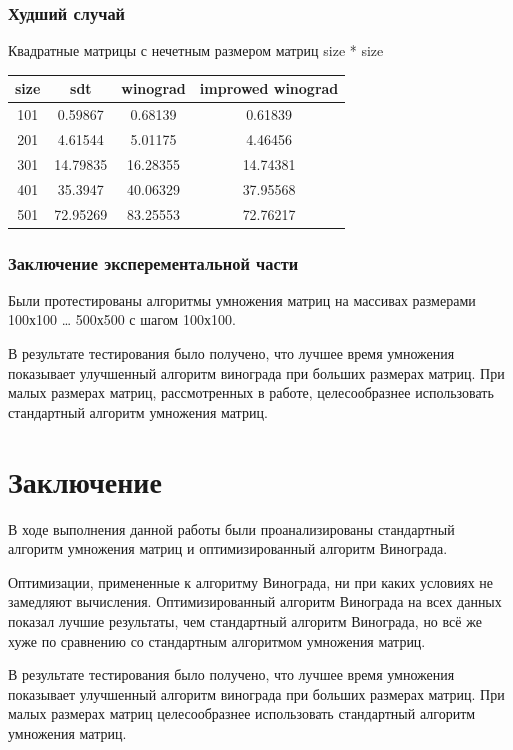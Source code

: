 \documentclass[12pt]{report}
\begin{document}
\subsection{Худший случай}
Квадратные матрицы с нечетным размером матриц size * size
\begin{center}
	\begin{tabular}{|c c c c|} 
 	\hline
	size & sdt & winograd & improwed winograd \\ [0.5ex] 
 	\hline\hline
 	101 & 0.59867 & 0.68139 & 0.61839 \\
 	\hline
 	201 & 4.61544 & 5.01175 & 4.46456\\
 	\hline
	301 & 14.79835 & 16.28355 & 14.74381 \\
	\hline
	401 & 35.3947 & 40.06329 & 37.95568\\
	\hline
	501 & 72.95269 & 83.25553 & 72.76217\\
	\hline
	\end{tabular}
\end{center}






\newpage
\subsection{Заключение эксперементальной части}
Были протестированы алгоритмы умножения матриц на массивах размерами 100х100 … 500х500 с шагом 100х100.

В результате тестирования было получено, что лучшее время умножения показывает улучшенный алгоритм винограда при больших размерах матриц. При малых размерах матриц, рассмотренных в работе, целесообразнее использовать стандартный алгоритм умножения матриц.

\chapter*{Заключение}

В ходе выполнения данной работы были проанализированы стандартный алгоритм умножения матриц и оптимизированный алгоритм Винограда.

Оптимизации, примененные к алгоритму Винограда, ни при каких условиях не замедляют вычисления. Оптимизированный алгоритм Винограда на всех данных показал лучшие результаты, чем стандартный алгоритм Винограда, но всё же хуже по сравнению со стандартным алгоритмом умножения матриц.

В результате тестирования было получено, что лучшее время умножения показывает улучшенный алгоритм винограда при больших размерах матриц. При малых размерах матриц целесообразнее использовать стандартный алгоритм умножения матриц.
\end{document}
